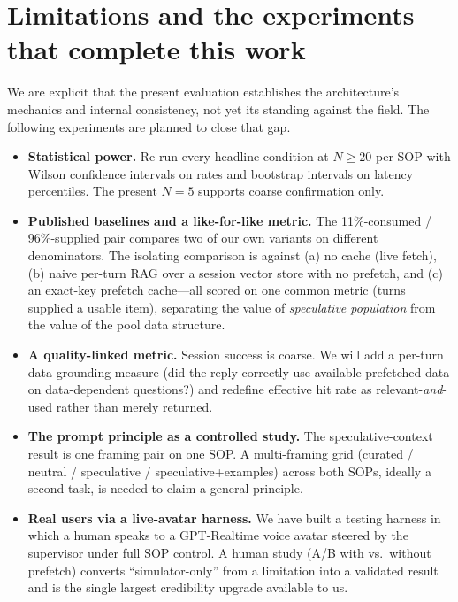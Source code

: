 \documentclass[10pt,twocolumn]{article}
\begin{document}
\section{Limitations and the experiments that complete this work}
\label{sec:limitations}

We are explicit that the present evaluation establishes the architecture's mechanics and internal consistency, not yet its standing against the field. The following experiments are planned to close that gap.

\begin{itemize}[leftmargin=*, itemsep=3pt]
\item \textbf{Statistical power.} Re-run every headline condition at $N\ge20$ per SOP with Wilson confidence intervals on rates and bootstrap intervals on latency percentiles. The present $N{=}5$ supports coarse confirmation only.
\item \textbf{Published baselines and a like-for-like metric.} The 11\%-consumed / 96\%-supplied pair compares two of our own variants on different denominators. The isolating comparison is against (a) no cache (live fetch), (b) naive per-turn RAG over a session vector store with no prefetch, and (c) an exact-key prefetch cache---all scored on one common metric (turns supplied a usable item), separating the value of \emph{speculative population} from the value of the pool data structure.
\item \textbf{A quality-linked metric.} Session success is coarse. We will add a per-turn data-grounding measure (did the reply correctly use available prefetched data on data-dependent questions?) and redefine effective hit rate as relevant-\emph{and}-used rather than merely returned.
\item \textbf{The prompt principle as a controlled study.} The speculative-context result is one framing pair on one SOP. A multi-framing grid (curated / neutral / speculative / speculative+examples) across both SOPs, ideally a second task, is needed to claim a general principle.
\item \textbf{Real users via a live-avatar harness.} We have built a testing harness in which a human speaks to a GPT-Realtime voice avatar steered by the supervisor under full SOP control. A human study (A/B with vs.\ without prefetch) converts ``simulator-only'' from a limitation into a validated result and is the single largest credibility upgrade available to us.

\end{itemize}
\end{document}
